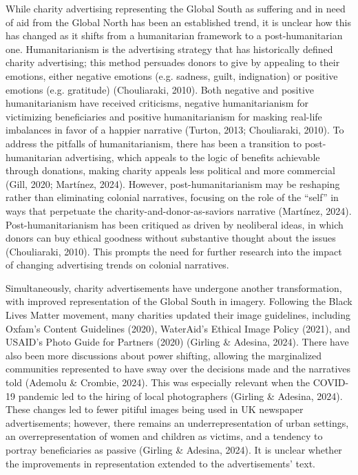 While charity advertising representing the Global South as suffering and in need of aid from the Global North has been an established trend, it is unclear how this has changed as it shifts from a humanitarian framework to a post-humanitarian one. Humanitarianism is the advertising strategy that has historically defined charity advertising; this method persuades donors to give by appealing to their emotions, either negative emotions (e.g. sadness, guilt, indignation) or positive emotions (e.g. gratitude) (Chouliaraki, 2010). Both negative and positive humanitarianism have received criticisms, negative humanitarianism for victimizing beneficiaries and positive humanitarianism for masking real-life imbalances in favor of a happier narrative (Turton, 2013; Chouliaraki, 2010). To address the pitfalls of humanitarianism, there has been a transition to post-humanitarian advertising, which appeals to the logic of benefits achievable through donations, making charity appeals less political and more commercial (Gill, 2020; Martínez, 2024). However, post-humanitarianism may be reshaping rather than eliminating colonial narratives, focusing on the role of the “self” in ways that perpetuate the charity-and-donor-as-saviors narrative (Martínez, 2024). Post-humanitarianism has been critiqued as driven by neoliberal ideas, in which donors can buy ethical goodness without substantive thought about the issues (Chouliaraki, 2010). This prompts the need for further research into the impact of changing advertising trends on colonial narratives.

Simultaneously, charity advertisements have undergone another transformation, with improved representation of the Global South in imagery. Following the Black Lives Matter movement, many charities updated their image guidelines, including Oxfam's Content Guidelines (2020), WaterAid's Ethical Image Policy (2021), and USAID's Photo Guide for Partners (2020) (Girling \& Adesina, 2024). There have also been more discussions about power shifting, allowing the marginalized communities represented to have sway over the decisions made and the narratives told (Ademolu \& Crombie, 2024). This was especially relevant when the COVID-19 pandemic led to the hiring of local photographers (Girling \& Adesina, 2024). These changes led to fewer pitiful images being used in UK newspaper advertisements; however, there remains an underrepresentation of urban settings, an overrepresentation of women and children as victims, and a tendency to portray beneficiaries as passive (Girling \& Adesina, 2024). It is unclear whether the improvements in representation extended to the advertisements' text.

